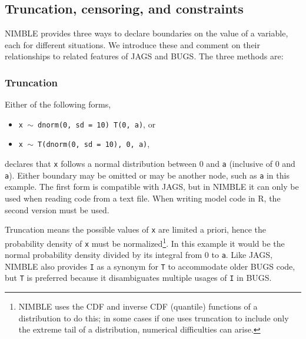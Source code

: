 \documentclass[12pt,oneside]{book}\usepackage[]{graphicx}\usepackage[]{color}
\def\cd#1{\texttt{#1}}
\begin{document}
\subsection{Truncation, censoring, and constraints}
\label{subsec:trunc}

NIMBLE provides three ways to declare boundaries on the value of a variable, each for different situations.  We introduce these and comment on their relationships to related features of JAGS and BUGS.  The three methods are:

\subsubsection{Truncation}
Either of the following forms, 
\begin{itemize}
\item \cd{x $\sim$ dnorm(0, sd = 10) T(0, a)}, or
\item \cd{x $\sim$ T(dnorm(0, sd = 10), 0, a)}, 
  \end{itemize}
  declares that \cd{x} follows a normal distribution between 0 and
  \cd{a} (inclusive of 0 and \cd{a}).  Either boundary may be omitted or may be another node, such as \cd{a} in this example.  The first form is compatible with JAGS, but in NIMBLE it can only be used when reading code from a text file.  When writing model code in R, the second version must be used.  

Truncation means the possible values of \cd{x} are limited a priori, hence the probability density of \cd{x} must be normalized\footnote{NIMBLE uses the CDF and inverse CDF (quantile) functions of a distribution to do this; in some cases if one uses truncation to include only the extreme tail of a distribution, numerical difficulties can arise.}.  In this example it would be the normal probability density divided by its integral from 0 to \cd{a}.  Like JAGS, NIMBLE also provides \cd{I} as a synonym for \cd{T} to accommodate older BUGS code, but \cd{T} is preferred because it disambiguates multiple usages of \cd{I} in BUGS.
\end{document}
